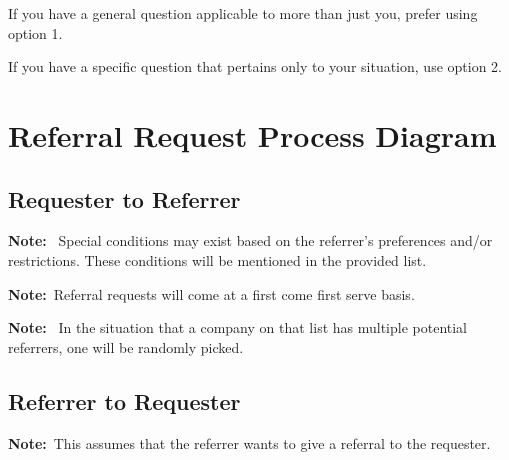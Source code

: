 \documentclass[letterpaper, 12pt]{article}
\newcommand{\note}[1]{\textbf{Note:}~#1}
\begin{document}
\begin{enumerate}[leftmargin=*]
{\begin{enumerate}
            \end{enumerate}

            If you have a general question applicable to more than just you,
            prefer using option 1.

            If you have a specific question that pertains only to your
            situation, use option 2.
        }
\end{enumerate}


\section{Referral Request Process Diagram}

\subsection{Requester to Referrer}

\label{fig:requesterToReferrer}

\note{%
    Special conditions may exist based on the referrer's preferences and/or
    restrictions. These conditions will be mentioned in the provided list.
}

\note{Referral requests will come at a first come first serve basis.}

\note{%
    In the situation that a company on that list has multiple potential
    referrers, one will be randomly picked.
}

\subsection{Referrer to Requester }

\label{fig:referrerToRequester}


\note{This assumes that the referrer wants to give a referral to the requester.}
\end{document}
